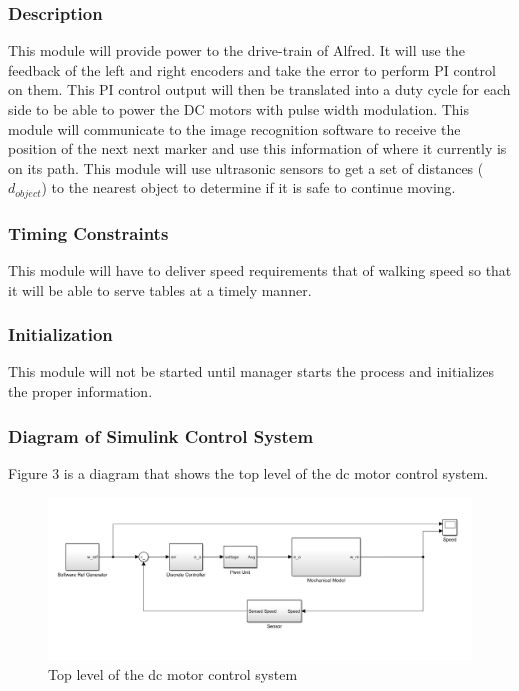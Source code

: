 \documentclass [10pt]{article}
\begin{document}

\subsubsection{Description}
This module will provide power to the drive-train of Alfred. It will use the feedback of the left and right encoders and take the error to perform PI control on them. This PI control output will then be translated into a duty cycle for each side to be able to power the DC motors with pulse width modulation. This module will communicate to the image recognition software to receive the position of the next next marker and use this information of where it currently is on its path. This module will use ultrasonic sensors to get a set of distances ($ d_{object} $) to the nearest object to determine if it is safe to continue moving.


\subsubsection{Timing Constraints}
This module will have to deliver speed requirements that of walking speed so that it will be able to serve tables at a timely manner.


\subsubsection{Initialization}
This module will not be started until manager starts the process and initializes the proper information.


\subsubsection{Diagram of Simulink Control System}
Figure 3 is a diagram that shows the top level of the dc motor control system. 
\begin{figure} [h!]
	\centering
	\includegraphics [scale = 0.4] {Figures/Simulink.png}
	\caption{Top level of the dc motor control system}
\end{figure}
\end{document}
